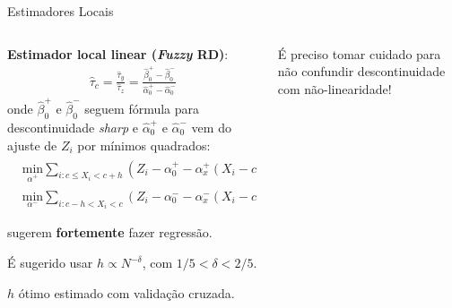 \documentclass[aspectratio=1610, 10pt]{beamer}
\begin{document}


\begin{frame}{Estimadores Locais}

    \begin{columns}[T] %
		\begin{column}{0.48\linewidth} %
        \justifying
            \textbf{Estimador local linear (\emph{Fuzzy} RD)}:
            \begin{align*}
                \hat{\tau}_c = \frac{\hat{\tau}_y}{\hat{\tau}_z} = \frac{\hat{\beta}_0^+ - \hat{\beta}_0^-}{\hat{\alpha}_0^+ - \hat{\alpha}_0^-}
            \end{align*}
            onde $\hat{\beta}_0^+$ e $\hat{\beta}_0^-$ seguem fórmula para descontinuidade \emph{sharp} e $\hat{\alpha}_0^+$ e $\hat{\alpha}_0^-$ vem do ajuste de $Z_i$ por mínimos quadrados:
            \begin{align*}
               &\textstyle{ \underset{\alpha^+}{\mathrm{min}} \sum_{i:c \leq X_i < c+h}(Z_i - \alpha_0^+ - \alpha_x^+(X_i - c))^2} \\
               &\textstyle{\underset{\alpha^-}{\mathrm{min}} \sum_{i:c-h < X_i < c}(Z_i - \alpha_0^- - \alpha_x^-(X_i - c))^2 }.
            \end{align*}

            \vspace{0.1cm}
            \cite{imbens2008regression} sugerem \textbf{fortemente} fazer regressão.

            É sugerido usar $h \propto N^{-\delta}$, com $1/5 < \delta < 2/5$.

            $h$ ótimo estimado com validação cruzada.
        \end{column}
        \begin{column}{0.48\linewidth}
            \justifying
            É preciso tomar cuidado para não confundir descontinuidade com não-linearidade!


\end{column}
\end{columns}
\end{frame}
\end{document}
